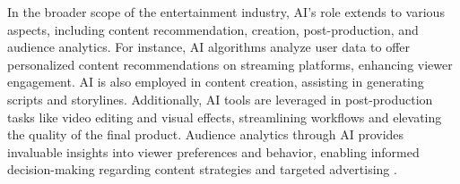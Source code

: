 In the broader scope of the entertainment industry, AI's role extends to various aspects, including content recommendation, creation, post-production, and audience analytics. For instance, AI algorithms analyze user data to offer personalized content recommendations on streaming platforms, enhancing viewer engagement. AI is also employed in content creation, assisting in generating scripts and storylines. Additionally, AI tools are leveraged in post-production tasks like video editing and visual effects, streamlining workflows and elevating the quality of the final product. Audience analytics through AI provides invaluable insights into viewer preferences and behavior, enabling informed decision-making regarding content strategies and targeted advertising \autocite{WebisoftEntAI}.
